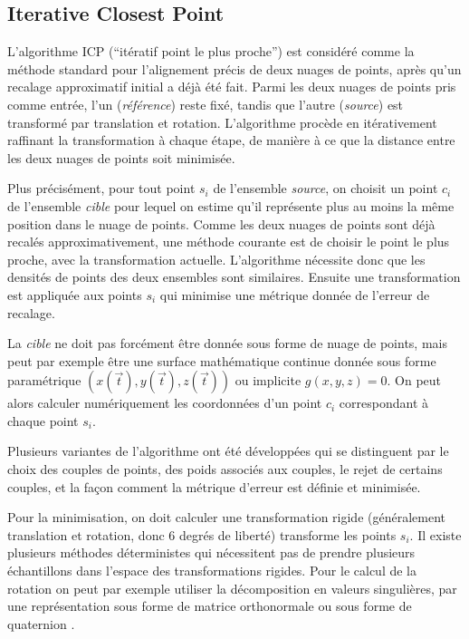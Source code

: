 \documentclass[a4paper,10pt]{scrreprt}
\begin{document}
\subsection{Iterative Closest Point}
L'algorithme ICP (``itératif point le plus proche'') est considéré comme la méthode standard pour l'alignement précis de deux nuages de points, après qu'un recalage approximatif initial a déjà été fait. Parmi les deux nuages de points pris comme entrée, l'un (\emph{référence}) reste fixé, tandis que l'autre (\emph{source}) est transformé par translation et rotation. L'algorithme procède en itérativement raffinant la transformation à chaque étape, de manière à ce que la distance entre les deux nuages de points soit minimisée.

Plus précisément, pour tout point $s_i$ de l'ensemble \emph{source}, on choisit un point $c_i$ de l'ensemble \emph{cible} pour lequel on estime qu'il représente plus au moins la même position dans le nuage de points. Comme les deux nuages de points sont déjà recalés approximativement, une méthode courante est de choisir le point le plus proche, avec la transformation actuelle. L'algorithme nécessite donc que les densités de points des deux ensembles sont similaires. Ensuite une transformation est appliquée aux points $s_i$ qui minimise une métrique donnée de l'erreur de recalage.

La \emph{cible} ne doit pas forcément être donnée sous forme de nuage de points, mais peut par exemple être une surface mathématique continue donnée sous forme paramétrique $(x(\vec{t}),y(\vec{t}),z(\vec{t}))$ ou implicite $g(x, y, z) = 0$. On peut alors calculer numériquement les coordonnées d'un point $c_i$ correspondant à chaque point $s_i$. \cite{Besl1992}

Plusieurs variantes de l'algorithme ont été développées qui se distinguent par le choix des couples de points, des poids associés aux couples, le rejet de certains couples, et la façon comment la métrique d'erreur est définie et minimisée. \cite{Rusi2001}

Pour la minimisation, on doit calculer une transformation rigide (généralement translation et rotation, donc 6 degrés de liberté) transforme les points $s_i$. Il existe plusieurs méthodes déterministes qui nécessitent pas de prendre plusieurs échantillons dans l'espace des transformations rigides. Pour le calcul de la rotation on peut par exemple utiliser la décomposition en valeurs singulières, par une représentation sous forme de matrice orthonormale ou sous forme de quaternion \cite{Horn1986}.
\end{document}
